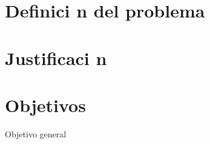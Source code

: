 \documentclass{article}
\begin{document}

\makeatletter
\def\thickhrulefill{\leavevmode \leaders \hrule height 1ex \hfill \kern \z@}
\def\@makechapterhead#1{%
  \vspace*{10\p@}%
  {\parindent \z@ \centering \reset@font
        \thickhrulefill\quad
        \scshape \@chapapp{} \thechapter
        \quad \thickhrulefill
        \par\nobreak
        \vspace*{10\p@}%
        \interlinepenalty\@M
        \hrule
        \vspace*{10\p@}%
        \Huge \bfseries #1\par\nobreak
        \par
        \vspace*{10\p@}%
        \hrule
    \vskip 40\p@
  }}
\def\@makeschapterhead#1{%
  \vspace*{10\p@}%
  {\parindent \z@ \centering \reset@font
        \thickhrulefill
        \par\nobreak
        \vspace*{10\p@}%
        \interlinepenalty\@M
        \hrule
        \vspace*{10\p@}%
        \Huge \bfseries #1\par\nobreak
        \par
        \vspace*{10\p@}%
        \hrule
    \vskip 40\p@
  }}

\newpage
{} \setcounter{page}{1}

\chapter{Definici n del problema}


\chapter{Justificaci n}


\chapter{Objetivos}
\vspace{5 cm}
\Large{Objetivo general}
\end{document}

